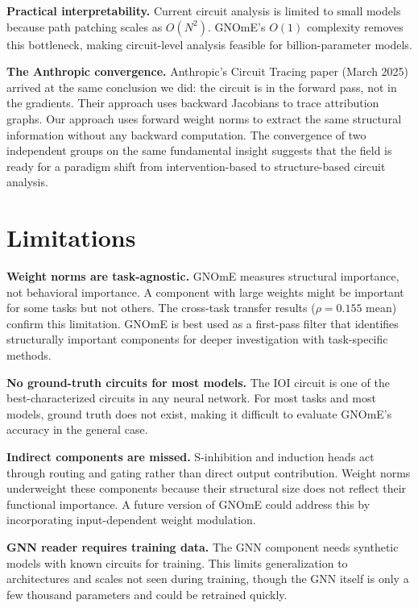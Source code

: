 \documentclass[11pt]{article}
\begin{document}
\textbf{Practical interpretability.} Current circuit analysis is limited to small models because path patching scales as $O(N^2)$. GNOmE's $O(1)$ complexity removes this bottleneck, making circuit-level analysis feasible for billion-parameter models.

\textbf{The Anthropic convergence.} Anthropic's Circuit Tracing paper (March 2025) arrived at the same conclusion we did: the circuit is in the forward pass, not in the gradients. Their approach uses backward Jacobians to trace attribution graphs. Our approach uses forward weight norms to extract the same structural information without any backward computation. The convergence of two independent groups on the same fundamental insight suggests that the field is ready for a paradigm shift from intervention-based to structure-based circuit analysis.

\section{Limitations}
\label{sec:limits}

\textbf{Weight norms are task-agnostic.} GNOmE measures structural importance, not behavioral importance. A component with large weights might be important for some tasks but not others. The cross-task transfer results ($\rho = 0.155$ mean) confirm this limitation. GNOmE is best used as a first-pass filter that identifies structurally important components for deeper investigation with task-specific methods.

\textbf{No ground-truth circuits for most models.} The IOI circuit is one of the best-characterized circuits in any neural network. For most tasks and most models, ground truth does not exist, making it difficult to evaluate GNOmE's accuracy in the general case.

\textbf{Indirect components are missed.} S-inhibition and induction heads act through routing and gating rather than direct output contribution. Weight norms underweight these components because their structural size does not reflect their functional importance. A future version of GNOmE could address this by incorporating input-dependent weight modulation.

\textbf{GNN reader requires training data.} The GNN component needs synthetic models with known circuits for training. This limits generalization to architectures and scales not seen during training, though the GNN itself is only a few thousand parameters and could be retrained quickly.
\end{document}

